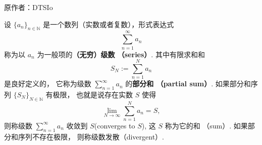 

原作者：DTSIo

设 $\{a_n\}_{n\in\mathbb{N}}$ 是一个数列（实数或者复数），形式表达式
\[
\sum_{n=1}^\infty a_n
\]
称为以 $a_n$ 为一般项的\textbf{（无穷）级数 （series）}. 其中有限求和和
\[
S_N:=\sum_{n=1}^N a_n
\]
是良好定义的， 它称为级数 $\sum_{n=1}^\infty a_n$ 的\textbf{部分和 （partial sum）}. 如果部分和序列 $\{S_N\}_{N\in\mathbb{N}}$ 有极限， 也就是说存在实数 $S$ 使得
\[
\lim_{N\to\infty}\sum_{n=1}^N a_n=S,
\] 
则称级数 $\sum_{n=1}^\infty a_n$ 收敛到 $S$(converges to $S$), 这 $S$ 称为它的和 （sum）. 如果部分和序列不存在极限， 则称级数发散（divergent）. 


